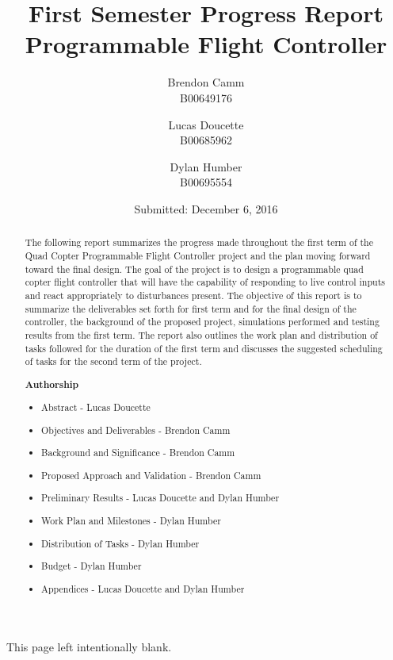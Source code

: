 \documentclass[12pt, twoside, letterpaper,titlepage]{article}
\title{First Semester Progress Report \\ Programmable Flight Controller}
\author{Brendon Camm \\ B00649176 \and Lucas Doucette \\ B00685962 \and Dylan Humber \\ B00695554}
\date{Submitted: December 6, 2016}
\begin{document}
	\maketitle
	\newpage
	\begin{center}
		This page left intentionally blank.
	\end{center}

	\newpage
	\begin{abstract} %
	The following report summarizes the progress made throughout the first term of the Quad Copter Programmable Flight Controller project and the plan moving forward toward the final design. The goal of the project is to design a programmable quad copter flight controller that will have the capability of responding to live control inputs and react appropriately to disturbances present. The objective of this report is to summarize the deliverables set forth for first term and for the final design of the controller, the background of the proposed project, simulations performed and testing results from the first term. The report also outlines the work plan and distribution of tasks followed for the duration of the first term and discusses the suggested scheduling of tasks for the second term of the project. 
	
	\textbf{Authorship}
	\begin{itemize}
		\itemsep-.5em
		\item{Abstract - Lucas Doucette}
		\item{Objectives and Deliverables - Brendon Camm}
		\item{Background and Significance - Brendon Camm}
		\item{Proposed Approach and Validation - Brendon Camm}
		\item{Preliminary Results - Lucas Doucette and Dylan Humber}
		\item{Work Plan and Milestones - Dylan Humber}
		\item{Distribution of Tasks - Dylan Humber}
		\item{Budget - Dylan Humber}
		\item{Appendices - Lucas Doucette and Dylan Humber}
	\end{itemize}
	
	\end{abstract}
	\setcounter{tocdepth}{2}
	\tableofcontents
	\pagebreak
	
	
	
	
	
	
	
	
	
	\newpage
	
	\appendix
	
	\newpage
	
	
	
	
\end{document}
